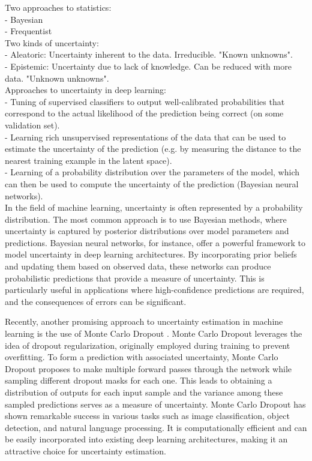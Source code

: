\cite{kingma_autoencoding_2014}
\cite{rezende_stochastic_2014}

Two approaches to statistics:\\
- Bayesian\\
- Frequentist\\

Two kinds of uncertainty:\\
- Aleatoric: Uncertainty inherent to the data. Irreducible. "Known unknowns".\\
- Epistemic: Uncertainty due to lack of knowledge. Can be reduced with more data. "Unknown unknowns".\\

Approaches to uncertainty in deep learning:\\
- Tuning of supervised classifiers to output well-calibrated probabilities that correspond to the actual likelihood of the prediction being correct (on some validation set).\\
- Learning rich unsupervised representations of the data that can be used to estimate the uncertainty of the prediction (e.g. by measuring the distance to the nearest training example in the latent space).\\
- Learning of a probability distribution over the parameters of the model, which can then be used to compute the uncertainty of the prediction (Bayesian neural networks).\\


In the field of machine learning, uncertainty is often represented by a probability distribution. The most common approach is to use Bayesian methods, where uncertainty is captured by posterior distributions over model parameters and predictions. Bayesian neural networks, for instance, offer a powerful framework to model uncertainty in deep learning architectures. By incorporating prior beliefs and updating them based on observed data, these networks can produce probabilistic predictions that provide a measure of uncertainty. This is particularly useful in applications where high-confidence predictions are required, and the consequences of errors can be significant.

Recently, another promising approach to uncertainty estimation in machine learning is the use of Monte Carlo Dropout \cite{gal_dropout_2016}. Monte Carlo Dropout leverages the idea of dropout regularization, originally employed during training to prevent overfitting. To form a prediction with associated uncertainty, Monte Carlo Dropout proposes to make multiple forward passes through the network while sampling different dropout masks for each one. This leads to obtaining a distribution of outputs for each input sample and the variance among these sampled predictions serves as a measure of uncertainty. Monte Carlo Dropout has shown remarkable success in various tasks such as image classification, object detection, and natural language processing. It is computationally efficient and can be easily incorporated into existing deep learning architectures, making it an attractive choice for uncertainty estimation.

